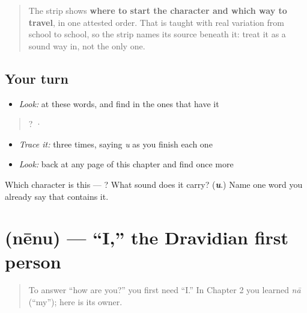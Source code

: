 \begin{quote}
The strip shows \textbf{where to start the character and which way to travel}, in one attested order. That is taught with real variation from school to school, so the strip names its source beneath it: treat it as a sound way in, not the only one.
\end{quote}

\subsection*{Your turn}
\begin{itemize}
\raggedright
  \item \emph{Look:} at these words, and find  in the ones that have it
\end{itemize}

\begin{quote}
  ?  ·  
\end{quote}

\begin{itemize}
\raggedright
  \item \emph{Trace it:}  three times, saying \emph{u} as you finish each one
  \item \emph{Look:} back at any page of this chapter and find  once more
\end{itemize}

\begin{tcolorbox}[breakable,colback=teal!4,colframe=teal!35!black,title={Before you move on}]
Which character is this — ? What sound does it carry? (\emph{\textbf{u}}.) Name one word you already say that contains it.
\end{tcolorbox}
\section[\texorpdfstring{\te{నేను} (nēnu)}{నేను (nēnu)}]{ (nēnu) — \textquotedblleft{}I,\textquotedblright{} the Dravidian first person}

\label{lesson:TE-C03-nenu}



\begin{quote}
To answer \textquotedblleft{}how are you?\textquotedblright{} you first need \textquotedblleft{}I.\textquotedblright{} In Chapter 2 you learned \emph{nā} (\textquotedblleft{}my\textquotedblright{}); here is its owner.
\end{quote}

